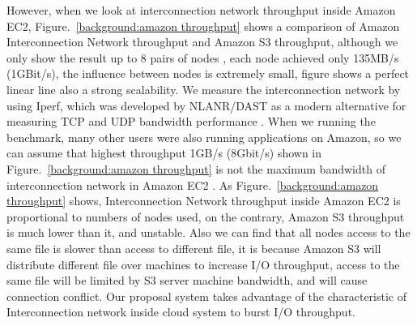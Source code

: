 However, when we look at interconnection network throughput inside Amazon EC2,
Figure.~\ref{background:amazon throughput} shows a comparison of Amazon Interconnection Network
throughput and Amazon S3 throughput, although we only show the result up to 8 pairs of nodes 
, each node achieved only 135MB/s (1GBit/s), the
influence between nodes is extremely small, figure shows a perfect linear line also a strong scalability.
We measure the interconnection network by using Iperf\cite{iperf}, which was developed by NLANR/DAST
as a modern alternative for measuring TCP and UDP bandwidth performance
.
When we running the
benchmark, many other users were also running applications on Amazon, so we can assume that highest
throughput 1GB/s (8Gbit/s) shown in Figure.~\ref{background:amazon throughput} is not the
maximum bandwidth of interconnection network in Amazon EC2 .
As Figure.~\ref{background:amazon throughput} shows, Interconnection Network throughput inside
Amazon EC2 is proportional to numbers of nodes used, on the contrary, Amazon S3 throughput is much
lower than it, and unstable.
Also we can find that all nodes access to the same file is slower than access to different file,
it is because Amazon S3 will distribute different file over machines to increase I/O throughput,
access to the same file will be limited by S3 server machine bandwidth, and will cause connection
conflict.
Our proposal system takes advantage of the characteristic of
Interconnection network inside cloud system to burst I/O throughput.

